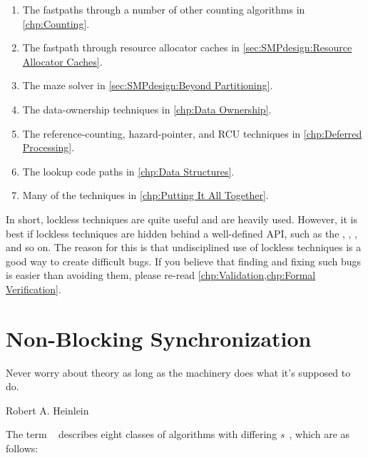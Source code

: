 \begin{enumerate}
\item	The fastpaths through a number of other counting algorithms
	in \cref{chp:Counting}.
\item	The fastpath through resource allocator caches in
	\cref{sec:SMPdesign:Resource Allocator Caches}.
\item	The maze solver in \cref{sec:SMPdesign:Beyond Partitioning}.
\item	The data-ownership techniques in \cref{chp:Data Ownership}.
\item	The reference-counting, hazard-pointer, and RCU techniques
	in \cref{chp:Deferred Processing}.
\item	The lookup code paths in \cref{chp:Data Structures}.
\item	Many of the techniques in \cref{chp:Putting It All Together}.
\end{enumerate}

In short, lockless techniques are quite useful and are heavily used.
However, it is best if lockless techniques are hidden behind a
well-defined API, such as the , ,
, and so on.
The reason for this is that undisciplined use of lockless techniques
is a good way to create difficult bugs.
If you believe that finding and fixing such bugs is easier than avoiding
them, please re-read
\cref{chp:Validation,chp:Formal Verification}.

\section{Non-Blocking Synchronization}
\label{sec:advsync:Non-Blocking Synchronization}
%
\epigraph{Never worry about theory as long as the machinery does what
	  it's supposed to do.}
	 {Robert A. Heinlein}

The term ~\cite{MauriceHerlihy90a}
describes eight classes of  algorithms with differing
\emph{s}~\cite{DanAlitarh2013PracticalProgress},
which are as follows:

